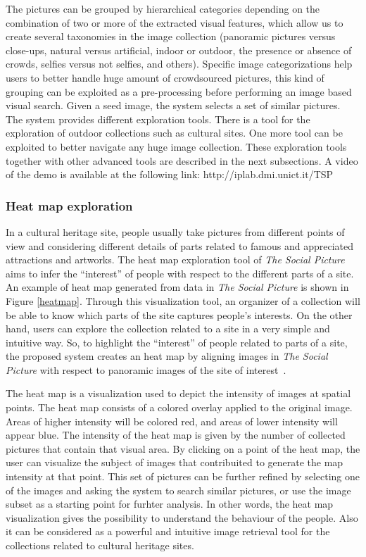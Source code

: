 The pictures can be grouped by hierarchical categories depending on the combination of two or more of the extracted visual features, which allow us to create several taxonomies in the image collection (panoramic pictures versus close-ups, natural versus artificial, indoor or outdoor, the presence or absence of crowds, selfies versus not selfies, and others).
Specific image categorizations help users to better handle huge amount of crowdsourced pictures, this kind of grouping can be exploited as a pre-processing before performing an image based visual search. Given a seed image, the system selects a set of similar pictures.
The system provides different exploration tools. There is a tool for the exploration of outdoor collections such as cultural sites. %
One more tool can be exploited to better navigate any huge image collection. These exploration tools together with other advanced tools are described in the next subsections.
A video of the demo is available at the following link:
http://iplab.dmi.unict.it/TSP

\subsubsection{Heat map exploration}
In a cultural heritage site, people usually take pictures from different points of view and considering different details of parts related to famous and appreciated attractions and artworks. The heat map exploration tool of \textit{The Social Picture} aims to infer the ``interest'' of people with respect to the different parts of a site. An example of heat map generated from data in \textit{The Social Picture} is shown in Figure \ref{heatmap}. Through this visualization tool, an organizer of a collection will be able to know which parts of the site captures people's interests.
On the other hand, users can explore the collection related to a site in a very simple and intuitive way. So, to highlight the ``interest'' of people related to parts of a site, the proposed system creates an heat map by aligning images in \textit{The Social Picture} with respect to panoramic images of the site of interest~\cite{Mikulik2015}.

The heat map is a visualization used to depict the intensity of images at spatial points. The heat map consists of a colored overlay applied to the original image. Areas of higher intensity will be colored red, and areas of lower intensity will appear blue. The intensity of the heat map is given by the number of collected pictures that contain that visual area.
By clicking on a point of the heat map, the user can visualize the subject of images that contribuited to generate the map intensity at that point. This set of pictures can be further refined by selecting one of the images and asking the system to search similar pictures, or use the image subset as a starting point for furhter analysis. In other words, the heat map visualization gives the possibility to understand the behaviour of the people. Also it can be considered as a powerful and intuitive image retrieval tool for the collections related to cultural heritage sites.


